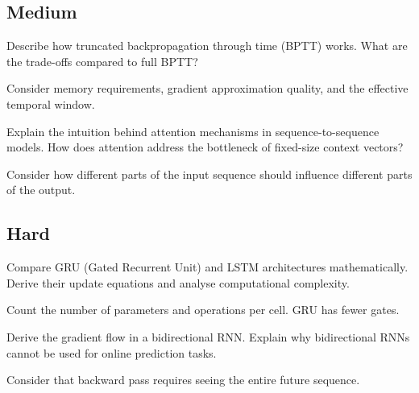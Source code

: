 \subsection*{Medium}

\begin{exercisebox}[medium]
\begin{problem}
Describe how truncated backpropagation through time (BPTT) works. What are the trade-offs compared to full BPTT?
\end{problem}
\begin{hintbox}
Consider memory requirements, gradient approximation quality, and the effective temporal window.
\end{hintbox}
\end{exercisebox}

\begin{exercisebox}[medium]
\begin{problem}
Explain the intuition behind attention mechanisms in sequence-to-sequence models. How does attention address the bottleneck of fixed-size context vectors?
\end{problem}
\begin{hintbox}
Consider how different parts of the input sequence should influence different parts of the output.
\end{hintbox}
\end{exercisebox}

\subsection*{Hard}

\begin{exercisebox}[hard]
\begin{problem}
Compare GRU (Gated Recurrent Unit) and LSTM architectures mathematically. Derive their update equations and analyse computational complexity.
\end{problem}
\begin{hintbox}
Count the number of parameters and operations per cell. GRU has fewer gates.
\end{hintbox}
\end{exercisebox}

\begin{exercisebox}[hard]
\begin{problem}
Derive the gradient flow in a bidirectional RNN. Explain why bidirectional RNNs cannot be used for online prediction tasks.
\end{problem}
\begin{hintbox}
Consider that backward pass requires seeing the entire future sequence.
\end{hintbox}
\end{exercisebox}

